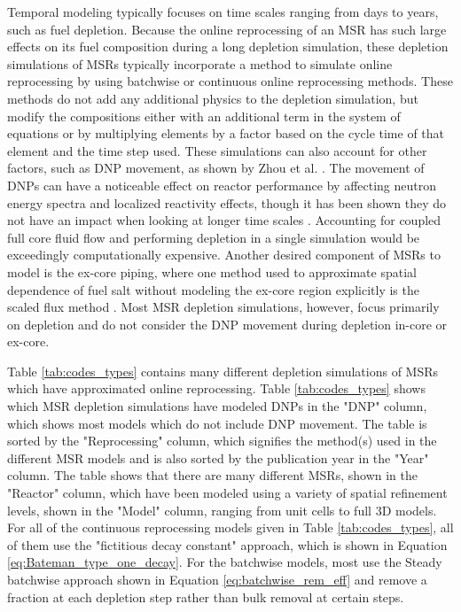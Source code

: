 Temporal modeling typically focuses on time scales ranging from days to years, such as fuel depletion. Because the online reprocessing of an MSR has such large effects on its fuel composition during a long depletion simulation, these depletion simulations of MSRs typically incorporate a method to simulate online reprocessing by using batchwise or continuous online reprocessing methods. These methods do not add any additional physics to the depletion simulation, but modify the compositions either with an additional term in the system of equations or by multiplying elements by a factor based on the cycle time of that element and the time step used.
These simulations can also account for other factors, such as DNP movement, as shown by Zhou et al. \cite{zhou_fuel_2018}.
The movement of DNPs can have a noticeable effect on reactor performance by affecting neutron energy spectra and localized reactivity effects, though it has been shown they do not have an impact when looking at longer time scales \cite{betzler_implementation_2017}.
Accounting for coupled full core fluid flow and performing depletion in a single simulation would be exceedingly computationally expensive.
Another desired component of MSRs to model is the ex-core piping, where one method used to approximate spatial dependence of fuel salt without modeling the ex-core region explicitly is the scaled flux method \cite{betzler_liquid-fueled_2021}.
Most MSR depletion simulations, however, focus primarily on depletion and do not consider the DNP movement during depletion in-core or ex-core.

Table \ref{tab:codes_types} contains many different depletion simulations of MSRs which have approximated online reprocessing.
Table \ref{tab:codes_types} shows which MSR depletion simulations have modeled DNPs in the "DNP" column, which shows most models which do not include DNP movement.
The table is sorted by the "Reprocessing" column, which signifies the method(s) used in the different MSR models and is also sorted by the publication year in the "Year" column.
The table shows that there are many different MSRs, shown in the "Reactor" column, which have been modeled using a variety of spatial refinement levels, shown in the "Model" column, ranging from unit cells to full 3D models.
For all of the continuous reprocessing models given in Table \ref{tab:codes_types}, all of them use the "fictitious decay constant" approach, which is shown in Equation \eqref{eq:Bateman_type_one_decay}.
 For the batchwise models, most use the Steady batchwise approach shown in Equation \eqref{eq:batchwise_rem_eff} and remove a fraction at each depletion step rather than bulk removal at certain steps.

